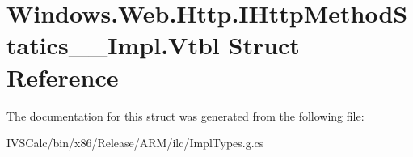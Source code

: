\hypertarget{struct_windows_1_1_web_1_1_http_1_1_i_http_method_statics_____impl_1_1_vtbl}{}\section{Windows.\+Web.\+Http.\+I\+Http\+Method\+Statics\+\_\+\+\_\+\+Impl.\+Vtbl Struct Reference}
\label{struct_windows_1_1_web_1_1_http_1_1_i_http_method_statics_____impl_1_1_vtbl}


The documentation for this struct was generated from the following file\+:\begin{DoxyCompactItemize}
\item 
I\+V\+S\+Calc/bin/x86/\+Release/\+A\+R\+M/ilc/Impl\+Types.\+g.\+cs\end{DoxyCompactItemize}
